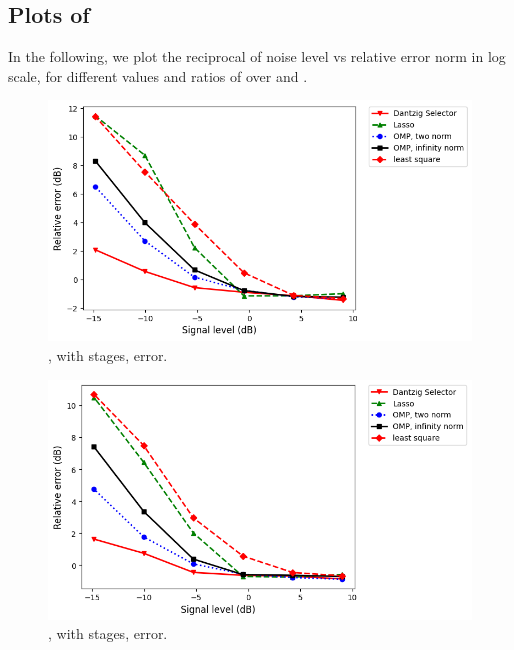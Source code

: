 \subsection {Plots of }

In the following, we plot the reciprocal of noise level vs relative error norm in log scale, for different values and ratios of  over  and .

\begin {figure} [H]
\includegraphics [width = \textwidth] {error-small-square-two.png}
\caption {, with  stages, error.}
\end {figure}

\begin {figure} [H]
\includegraphics [width = \textwidth] {error-small-tall-two.png}
\caption {, with  stages, error.}
\end {figure}

